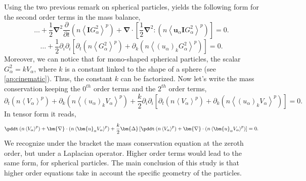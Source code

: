Using the two previous remark on spherical particles, yields the following form for the second order terms in the mass balance,
\begin{equation}
    \ldots +
    \frac{1}{2}  \bm{\nabla}^2
    \frac{\partial }{\partial t}\left(
          n \left<\bm{I}G_\alpha^2\right>^p
    \right) 
    + \bm{\nabla}\cdot\left[
        \frac{1}{2} \bm{\nabla}^{2} : (n \left< \bm{u}_\alpha \bm{I}G_\alpha^2\right>^p)
    \right] = 0.
\end{equation}
\begin{equation}
    \ldots +
    \frac{1}{2}  \partial_i\partial_i
    \left[
        \partial_t\left(
            n \left<G_\alpha^2\right>^p
            \right)
        + \partial_k
        \left(
            n \left< (u_\alpha)_k G_\alpha^2\right>^p
        \right)
    \right]
    = 0.
\end{equation}
Moreover, we can notice that for mono-shaped spherical particles, the scalar $G_\alpha^2 = k V_\alpha$, where $k$ is a constant linked to the shape of a sphere (see \ref{ap:cinematic}).
Thus, the constant $k$ can be factorized. 
Now let's write the mass conservation keeping the $0^{th}$ order terms and the $2^{th}$ order terms, 
\begin{equation}
    \partial_t\left(
        n \left<V_\alpha\right>^p
        \right)
    + \partial_k
    \left(
        n \left< (u_\alpha)_k V_\alpha\right>^p
    \right)
    +
    \frac{k}{2}  \partial_i\partial_i
    \left[
        \partial_t\left(
            n \left<V_\alpha\right>^p
            \right)
        + \partial_k
        \left(
            n \left< (u_\alpha)_k V_\alpha\right>^p
        \right)
    \right]
    = 0.
\end{equation}
In tensor form it reads, 
\begin{equation}
    \pddt\left(
        n \left<V_\alpha\right>^p
        \right)
    + \bm{\nabla}\cdot
    \left(
        n \left< \bm{u}_\alpha V_\alpha\right>^p
    \right)
    +
    \frac{k}{2}  \bm{\Delta}
    \left[
        \pddt\left(
            n \left<V_\alpha\right>^p
            \right)
        + \bm{\nabla}\cdot
        \left(
            n \left< \bm{u}_\alpha V_\alpha\right>^p
        \right)
    \right]
    = 0.
\end{equation}
We recognize under the bracket the mass conservation equation at the zeroth order, but under a Laplacian operator. 
Higher order terms would lead to the same form, for spherical particles.
The main conclusion of this study is that higher order equations take in account the specific geometry of the particles. 

